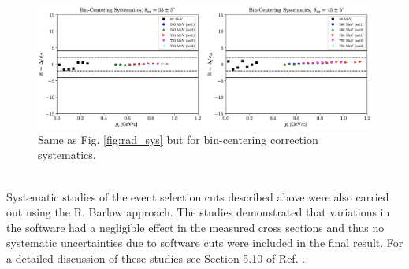\documentclass[aps, prl]{revtex4-2}  %
\begin{document}
\begin{figure}[!ht]
\includegraphics[scale=0.37]{plots/bc_sys.png}
\caption{Same as Fig. \ref{fig:rad_sys} but for bin-centering correction systematics.}
\label{fig:bc_sys}
\end{figure}\\
\indent Systematic studies of the event selection cuts described above were also carried out using the R. Barlow approach. The studies demonstrated that variations in the software had a negligible
effect in the measured cross sections and thus no systematic uncertainties due to software cuts were included in the final result. For a detailed discussion of these studies see Section 5.10 of Ref. \cite{cyero_phdthesis}.
\\\\

\end{document}
